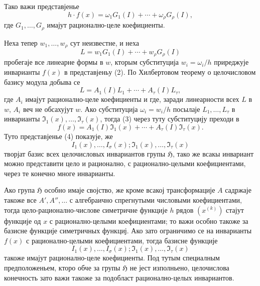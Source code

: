 ﻿\documentclass[11pt]{article}
\providecommand{\frH}{\mathfrak H}
\begin{document}
Тако важи представјенье
\begin{equation}
        h\cdot f(x)=\omega_1G_1(I)+\cdots+\omega_\rho G_\rho(I),
\end{equation}
где \(G_1,\ldots,G_\rho\) имајут рационално-целе коефициенты.

Неха тепер \(w_1,\ldots,w_\rho\) сут неизвестне, и неха
\[
        L=w_1G_1(I)+\cdots+w_\rho G_\rho(I)
\]
пробегаје все линеарне формы в \(w\), кторым субституција \(w_i=\omega_i/h\) приреджује инварианты \(f(x)\) в представјеньу (2). По Хилбертовом теорему о целочисловом базису модула добыва се
\begin{equation}
        L=A_1(I)L_1+\cdots+A_\tau(I)L_\tau,
\end{equation}
где \(A_i\) имајут рационално-целе коефициенты и где, заради линеарности всех \(L\) в \(w\), \(A_i\) веч не обсахујут \(w\). Ако субституција \(\omega_i=w_i/h\) посылаје \(L_1,\ldots,L_\tau\) в инварианты \(\mathfrak I_1(x),\ldots,\mathfrak I_\tau(x)\), тогда (3) через туту субституцију преходи в
\begin{equation}
        f(x)=A_1(I)\mathfrak I_1(x)+\cdots+A_\tau(I)\mathfrak I_\tau(x).
\end{equation}
Туто представјенье (4) показује, же
\[
        I_1(x),\ldots,I_\sigma(x);\mathfrak I_1(x),\ldots,\mathfrak I_\tau(x)
\]
творјат базис всех целочисловых инвариантов групы \(\frH\), тако же всакы инвариант можно представити цело и рационално, с рационално-целыми коефициентами, через те конечно многе инварианты.

Ако група \(\frH\) особно имаје својство, же кроме всакој трансформације \(A\) садржаје такоже все \(A',A'',\ldots\) с алгебраично спрегнутыми числовыми коефициентами, тогда цело-рационално-числове симетричне функције \(h\) рядов \((x^{(k)})\) стајут функције од \(x\) с рационално-целыми коефициентами; то важи особно такоже за базисне функције симетричных функциј. Ако зато ограничимо се на инварианты \(f(x)\) с рационално-целыми коефициентами, тогда базисне функције
\[
        I_1(x),\ldots,I_\sigma(x);\mathfrak I_1(x),\ldots,\mathfrak I_\tau(x)
\]
такоже имајут рационално-целе коефициенты. Под тутым специалным предположеньем, кторо обче за групы \(\frH\) не јест изполньено, целочислова конечность зато важи такоже за подобласт рационално-целых инвариантов.
\end{document}
